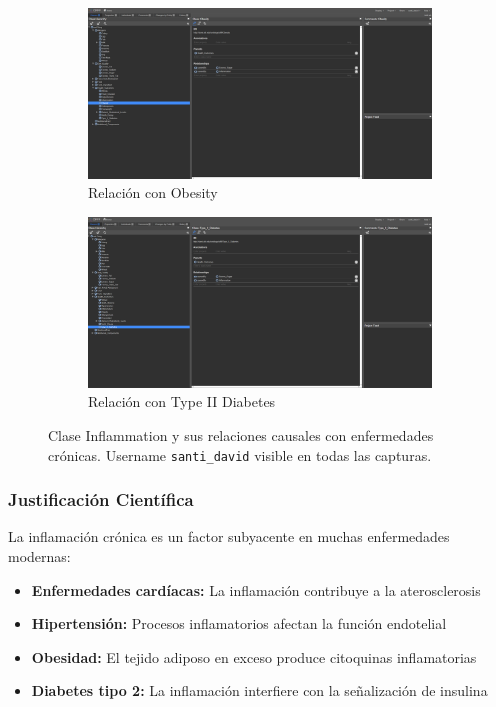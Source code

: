 \documentclass[12pt,a4paper]{article}
\begin{document}
\begin{figure}[H]
    \begin{subfigure}[b]{0.45\textwidth}
        \includegraphics[width=\textwidth]{screenshots/inflammation_3.png}
        \caption{Relación con Obesity}
    \end{subfigure}
    \hfill
    \begin{subfigure}[b]{0.45\textwidth}
        \includegraphics[width=\textwidth]{screenshots/inflammation_4.png}
        \caption{Relación con Type II Diabetes}
    \end{subfigure}
    
    \caption{Clase Inflammation y sus relaciones causales con enfermedades crónicas. Username \texttt{santi\_david} visible en todas las capturas.}
    \label{fig:inflammation_relations}
\end{figure}

\subsubsection{Justificación Científica}

La inflamación crónica es un factor subyacente en muchas enfermedades modernas:

\begin{itemize}
    \item \textbf{Enfermedades cardíacas:} La inflamación contribuye a la aterosclerosis
    \item \textbf{Hipertensión:} Procesos inflamatorios afectan la función endotelial
    \item \textbf{Obesidad:} El tejido adiposo en exceso produce citoquinas inflamatorias
    \item \textbf{Diabetes tipo 2:} La inflamación interfiere con la señalización de insulina
\end{itemize}
\end{document}
